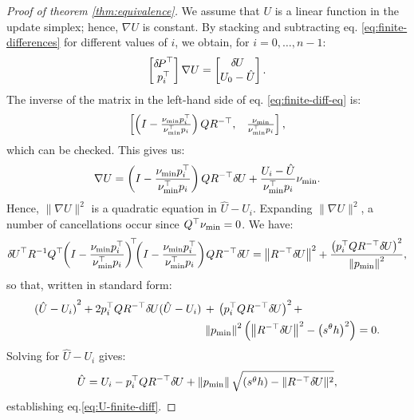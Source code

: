\documentclass[smallcondensed]{svjour3}
\begin{document}
\begin{proof}[Proof of theorem \ref{thm:equivalence}]
  We assume that $U$ is a linear function in the update simplex;
  hence, $\nabla U$ is constant. By stacking and subtracting eq.\@
  \ref{eq:finite-differences} for different values of $i$, we obtain,
  for $i = 0, \hdots, n - 1$:
  \begin{equation}\label{eq:finite-diff-eq}
    \begin{bmatrix}
      {\delta \hspace{-0.14em} P}^\top \\
      p_i^\top
    \end{bmatrix} \nabla U = \begin{bmatrix}
      {\delta \hspace{-0.09em} U} \\
      U_0 - \hat{U}
    \end{bmatrix}.
  \end{equation}
  The inverse of the matrix in the left-hand side of eq.\@
  \ref{eq:finite-diff-eq} is:
  \begin{equation}
    \begin{bmatrix}
      \left(I - \frac{\nu_{\operatorname{min}} p_i^\top}{\nu_{\operatorname{min}}^\top p_i}\right) Q R^{-\top}, &
      \frac{\nu_{\operatorname{min}}}{\nu_{\operatorname{min}}^\top p_i}
    \end{bmatrix},
  \end{equation}
  which can be checked. This gives us:
  \begin{equation}
    \nabla U = \left(I - \frac{\nu_{\operatorname{min}} p_i^\top}{\nu_{\operatorname{min}}^\top p_i}\right) Q R^{-\top} {\delta \hspace{-0.09em} U} + \frac{U_i - \hat{U}}{\nu_{\operatorname{min}}^\top p_i} \nu_{\operatorname{min}}.
  \end{equation}
  Hence, $\|\nabla U\|^2$ is a quadratic equation in
  $\hat{U} - U_i$. Expanding $\|\nabla U\|^2$, a number of
  cancellations occur since $Q^\top \nu_{\operatorname{min}} = 0$. We have:
  \begin{equation}
    {\delta \hspace{-0.09em} U}^\top R^{-1} Q^\top \hspace{-0.25em} \left(I - \frac{\nu_{\operatorname{min}} p_i^\top}{\nu_{\operatorname{min}}^\top p_i}\right)^{\hspace{-0.25em}\top} \hspace{-0.4em} \left(I - \frac{\nu_{\operatorname{min}} p_i^\top}{\nu_{\operatorname{min}}^\top p_i}\right) \hspace{-0.1em} Q R^{-\top} {\delta \hspace{-0.09em} U} = \left\|R^{-\top} {\delta \hspace{-0.09em} U}\right\|^2 + \frac{\left(p_i^\top Q R^{-\top} {\delta \hspace{-0.09em} U}\right)^2}{\left\|p_{\operatorname{min}}\right\|^2},
  \end{equation}
  so that, written in standard form:
  \begin{equation}
    \begin{aligned}
      {(\hat{U} - U_i)}^2 + 2 p_i^\top Q R^{-\top} {\delta \hspace{-0.09em} U} {(\hat{U} - U_i)} \,&+\, \left(p_i^\top Q R^{-\top} {\delta \hspace{-0.09em} U}\right)^2 + \\
       &\left\|p_{\operatorname{min}}\right\|^2 \left(\left\|R^{-\top} {\delta \hspace{-0.09em} U}\right\|^2 - \left(s^\theta h\right)^2\right) = 0.
    \end{aligned}
  \end{equation}
  Solving for $\hat{U} - U_i$ gives:
  \begin{equation}
    \hat{U} = U_i - p_i^\top Q R^{-\top} {\delta \hspace{-0.09em} U} + \left\|p_{\operatorname{min}}\right\| \sqrt{\left(s^\theta h\right) - \|R^{-\top} {\delta \hspace{-0.09em} U}\|^2},
  \end{equation}
  establishing eq.\@ \ref{eq:U-finite-diff}.


\end{proof}
\end{document}
